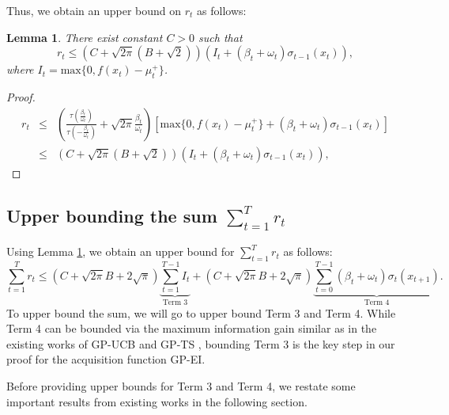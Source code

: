 \documentclass[twoside]{article}
\newtheorem{lemma}{Lemma}
\begin{document}
Thus, we obtain an upper bound on $r_t$ as follows:
\begin{lemma}
There exist constant $C > 0$ such that
$$r_t  \le  (C + \sqrt{2\pi}(B + \sqrt{2}))(I_t + (\beta_t+ \omega_t)\sigma_{t-1}(x_{t})),$$
where $I_t = \text{max}\{0, f(x_{t}) - \mu_t^+\}$.
\label{lem2.4}
\end{lemma}
\begin{proof}
\begin{eqnarray*}
r_t &\le &  (\frac{\tau(\frac{\beta_t}{\omega_t})}{ \tau(-\frac{\beta_t}{\omega_t})} + \sqrt{2\pi}\frac{\beta_t}{\omega_t}) [\text{max}\{0, f(x_{t}) - \mu_t^+\} + (\beta_t+ \omega_t)\sigma_{t-1}(x_{t})]\\
& \le & (C + \sqrt{2\pi}(B + \sqrt{2}))(I_t + (\beta_t+ \omega_t)\sigma_{t-1}(x_{t})),
\end{eqnarray*}
\end{proof}
\subsection{Upper bounding the sum $\sum_{t=1}^{T} r_t$}
Using Lemma \ref{lem2.4}, we obtain an upper bound for $\sum_{t=1}^{T} r_t$ as follows:
$$\sum_{t=1}^{T}r_t \le (C + \sqrt{2\pi}B + 2\sqrt{\pi}) \underbrace{\sum_{t=1}^{T-1}I_t}_{\text{Term 3}} + (C + \sqrt{2\pi}B + 2\sqrt{\pi}) \underbrace{\sum_{t=0}^{T-1}(\beta_t + \omega_t)\sigma_{t}(x_{t+1})}_{\text{Term 4}}.$$
To upper bound the sum, we will go to upper bound Term 3 and Term 4. While Term 4 can be bounded via the maximum information gain similar as in the existing works of GP-UCB and GP-TS \citep{Srinivas12,Chowdhury17}, bounding Term 3 is the key step in our proof for the acquisition function GP-EI.

Before providing upper bounds for Term 3 and Term 4, we restate some important results from existing works in the following section.
\end{document}
